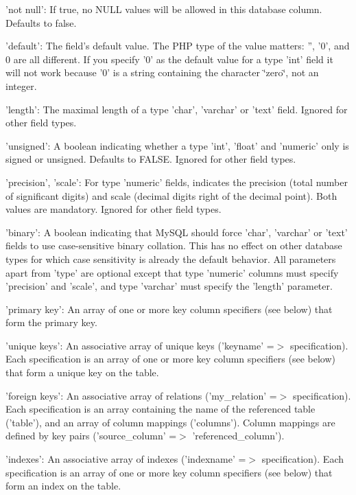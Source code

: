\begin{DoxyItemize}
\begin{DoxyItemize}
\item 'not null': If true, no NULL values will be allowed in this database column. Defaults to false.
\item 'default': The field's default value. The PHP type of the value matters: '', '0', and 0 are all different. If you specify '0' as the default value for a type 'int' field it will not work because '0' is a string containing the character \char`\"{}zero\char`\"{}, not an integer.
\item 'length': The maximal length of a type 'char', 'varchar' or 'text' field. Ignored for other field types.
\item 'unsigned': A boolean indicating whether a type 'int', 'float' and 'numeric' only is signed or unsigned. Defaults to FALSE. Ignored for other field types.
\item 'precision', 'scale': For type 'numeric' fields, indicates the precision (total number of significant digits) and scale (decimal digits right of the decimal point). Both values are mandatory. Ignored for other field types.
\item 'binary': A boolean indicating that MySQL should force 'char', 'varchar' or 'text' fields to use case-\/sensitive binary collation. This has no effect on other database types for which case sensitivity is already the default behavior. All parameters apart from 'type' are optional except that type 'numeric' columns must specify 'precision' and 'scale', and type 'varchar' must specify the 'length' parameter.
\end{DoxyItemize}
\end{DoxyItemize}

'primary key': An array of one or more key column specifiers (see below) that form the primary key.
\begin{DoxyItemize}
\item 'unique keys': An associative array of unique keys ('keyname' =$>$ specification). Each specification is an array of one or more key column specifiers (see below) that form a unique key on the table.
\item 'foreign keys': An associative array of relations ('my\_\-relation' =$>$ specification). Each specification is an array containing the name of the referenced table ('table'), and an array of column mappings ('columns'). Column mappings are defined by key pairs ('source\_\-column' =$>$ 'referenced\_\-column').
\item 'indexes': An associative array of indexes ('indexname' =$>$ specification). Each specification is an array of one or more key column specifiers (see below) that form an index on the table.
\end{DoxyItemize}

